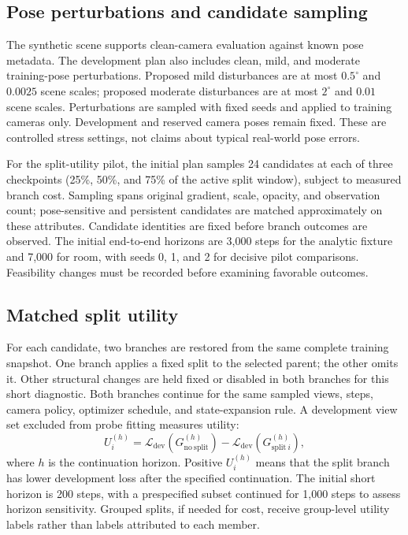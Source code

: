 \documentclass[10pt]{article}
\begin{document}
\subsection{Pose perturbations and candidate sampling}

The synthetic scene supports clean-camera evaluation against known pose
metadata. The development plan also includes clean, mild, and moderate
training-pose perturbations. Proposed mild disturbances are at most
\(0.5^\circ\) and \(0.0025\) scene scales; proposed moderate disturbances are
at most \(2^\circ\) and \(0.01\) scene scales. Perturbations are sampled with
fixed seeds and applied to training cameras only. Development and reserved
camera poses remain fixed. These are controlled stress settings, not claims
about typical real-world pose errors.

For the split-utility pilot, the initial plan samples 24 candidates at each of
three checkpoints (25\%, 50\%, and 75\% of the active split window), subject
to measured branch cost. Sampling spans original gradient, scale, opacity,
and observation count; pose-sensitive and persistent candidates are matched
approximately on these attributes. Candidate identities are fixed before
branch outcomes are observed. The initial end-to-end horizons are 3,000 steps
for the analytic fixture and 7,000 for room, with seeds 0, 1, and 2 for
decisive pilot comparisons. Feasibility changes must be recorded before
examining favorable outcomes.

\subsection{Matched split utility}

For each candidate, two branches are restored from the same complete training
snapshot. One branch applies a fixed split to the selected parent; the other
omits it. Other structural changes are held fixed or disabled in both branches
for this short diagnostic. Both branches continue for the same sampled views,
steps, camera policy, optimizer schedule, and state-expansion rule. A
development view set excluded from probe fitting measures utility:
\[
U_i^{(h)}
=
\mathcal{L}_{\mathrm{dev}}(G_{\mathrm{no\ split}}^{(h)})
-
\mathcal{L}_{\mathrm{dev}}(G_{\mathrm{split}\ i}^{(h)}),
\]
where \(h\) is the continuation horizon. Positive \(U_i^{(h)}\) means that
the split branch has lower development loss after the specified continuation.
The initial short horizon is 200 steps, with a prespecified subset continued
for 1,000 steps to assess horizon sensitivity. Grouped splits, if needed for
cost, receive group-level utility labels rather than labels attributed to each
member.
\end{document}
